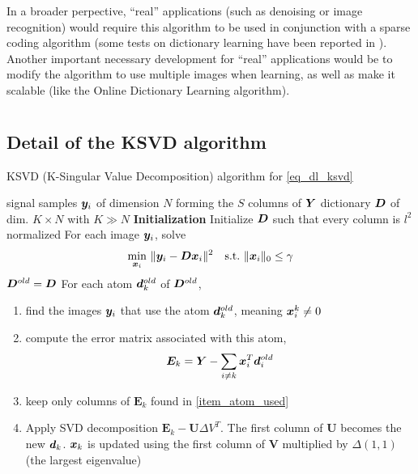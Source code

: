 \noindent
In a broader perpective, “real” applications (such as denoising or image recognition) would require this algorithm to be used in conjunction with a sparse coding algorithm (some tests on dictionary learning have been reported in \cite{chabiron_optimization_2016}). Another important necessary development for “real” applications would be to modify the algorithm to use multiple images when learning, as well as make it scalable (like the Online Dictionary Learning algorithm).


\clearpage
{}
\appendix

\chapter{}

\section{Detail of the \ac{KSVD} algorithm}\label{sec_ksvd_detail}
\begin{algorithm}
    \caption{\ac{KSVD} (K-Singular Value Decomposition) algorithm for \eqref{eq_dl_ksvd}}\label{alg_ksvd}
  \begin{algorithmic}[1]
    \Input signal samples $\bm{y}_i$ of dimension $N$ forming the $S$ columns of $\bm{Y}$
    \Output dictionary $\bm{D}$ of dim. $K \times N$ with $K \gg N$
    \State \textbf{Initialization} Initialize $\bm{D}$ such that every column is $l^2$ normalized
	\State For each image $\bm{y}_i$, solve \label{alg_ksvd_sparse_coding}
		\begin{align*}
			\quad \min_{\bm{x}_i}~ & \lVert \bm{y}_i-\bm{D}\bm{x}_i\rVert^2 \quad \text{s.t.}~ \lVert \bm{x}_i \rVert_0 \le \gamma
		\end{align*}
	\State $\bm{D}^{old} = \bm{D}$
	\State For each atom $\bm{d}_k^{old}$ of $\bm{D}^{old}$, \label{alg_ksvd_dict_update}
	\begin{enumerate}[leftmargin=15mm,label=(\alph*)]
		\item find the images $\bm{y}_i$ that use the atom $\bm{d}_k^{old}$, meaning $\bm{x}_i^k \ne 0$\label{item_atom_used}
		\item compute the error matrix associated with this atom,
		\begin{align*}
			\bm{E}_k = \bm{Y}-\sum_{i\ne k} \bm{x}_i^T\bm{d}_i^{old}
		\end{align*}
		\item keep only columns of $\bm{E}_k$ found in \cref{item_atom_used}
		\item Apply SVD decomposition $\bm{E}_k - \bm{U} \Delta V^T$. The first column of $\bm{U}$ becomes the new $\bm{d}_k$. $\bm{x}_k$ is updated using the first column of $\bm{V}$ multiplied by $\Delta(1,1)$ (the largest eigenvalue)
	\end{enumerate}
    \EndWhile
  \end{algorithmic}
\end{algorithm}



